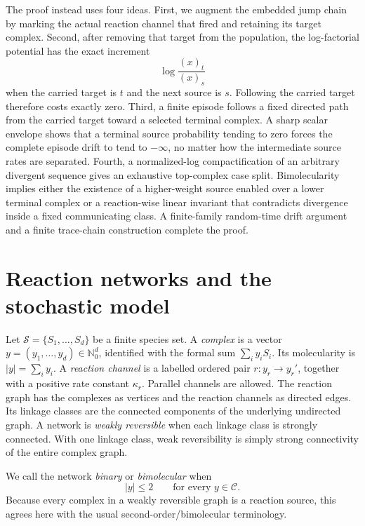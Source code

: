 The proof instead uses four ideas.  First, we augment the embedded jump chain
by marking the actual reaction channel that fired and retaining its target
complex.  Second, after removing that target from the population, the
log-factorial potential has the exact increment
\[
  \log\frac{(x)_t}{(x)_s}
\]
when the carried target is \(t\) and the next source is \(s\).  Following the
carried target therefore costs exactly zero.  Third, a finite episode follows
a fixed directed path from the carried target toward a selected terminal
complex.  A sharp scalar envelope shows that a terminal source probability
tending to zero forces the complete episode drift to tend to \(-\infty\), no
matter how the intermediate source rates are separated.  Fourth, a
normalized-log compactification of an arbitrary divergent sequence gives an
exhaustive top-complex case split.  Bimolecularity implies either the
existence of a higher-weight source enabled over a lower terminal complex or
a reaction-wise linear invariant that contradicts divergence inside a fixed
communicating class.  A finite-family random-time drift argument and a finite
trace-chain construction complete the proof.

\section{Reaction networks and the stochastic model}\label{sec:model}

Let \(\mathcal S=\{S_1,\dots,S_d\}\) be a finite species set.  A
\emph{complex} is a vector \(y=(y_1,\dots,y_d)\in\mathbb N_0^d\), identified
with the formal sum \(\sum_i y_iS_i\).  Its molecularity is
\(|y|=\sum_i y_i\).  A \emph{reaction channel} is a labelled ordered pair
\(r:y_r\to y_r'\), together with a positive rate constant \(\kappa_r\).
Parallel channels are allowed.  The reaction graph has the complexes as
vertices and the reaction channels as directed edges.  Its linkage classes
are the connected components of the underlying undirected graph.  A network
is \emph{weakly reversible} when each linkage class is strongly connected.
With one linkage class, weak reversibility is simply strong connectivity of
the entire complex graph.

We call the network \emph{binary} or \emph{bimolecular} when
\begin{equation}\label{eq:binary}
  |y|\le2\qquad\text{for every }y\in\mathcal C.
\end{equation}
Because every complex in a weakly reversible graph is a reaction source, this
agrees here with the usual second-order/bimolecular terminology.

